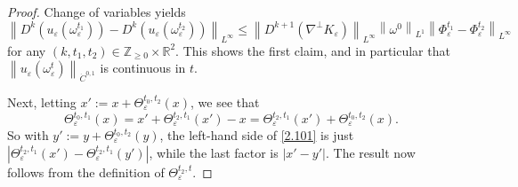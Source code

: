 \documentclass[reqno,centertags,12pt]{amsart}
\theoremstyle{definition}
\numberwithin{equation}{section}
\newcommand{\abs}[1]{\left\lvert#1\right\rvert}
\newcommand{\norm}[1]{\left\|#1\right\|}
\newcommand{\bbR}{{\mathbb{R}}}
\newcommand{\bbZ}{{\mathbb{Z}}}
\newcommand{\eps}{\varepsilon}
\begin{document}
\begin{proof}
    Change of variables  yields
    \[
        \norm{D^{k}(u_{\eps}(\omega_{\eps}^{t_{1}}))
        - D^{k}(u_{\eps}(\omega_{\eps}^{t_{2}}))}_{L^{\infty}}
        \leq \norm{D^{k+1}(\nabla^{\perp}K_{\eps})}_{L^{\infty}}
        \norm{\omega^{0}}_{L^{1}}
        \norm{\Phi_{\eps}^{t_{1}} - \Phi_{\eps}^{t_{2}}}_{L^{\infty}}
    \]
    for any $(k,t_{1},t_{2})\in\bbZ_{\geq 0}\times\bbR^{2}$.  This shows
    the first claim, and in particular that $\norm{u_{\eps}(\omega_{\eps}^{t})}_{\dot{C}^{0,1}}$
    is continuous in $t$. 

    Next, letting $x':=x + \Theta_{\eps}^{t_{0},t_{2}}(x)$, we see that
    \[
        \Theta_{\eps}^{t_{0},t_{1}}(x) = x' + \Theta_{\eps}^{t_{2},t_{1}}(x') - x
        = \Theta_{\eps}^{t_{2},t_{1}}(x') + \Theta_{\eps}^{t_{0},t_{2}}(x).
    \]
    So with $y':=y + \Theta_{\eps}^{t_{0},t_{2}}(y)$, the left-hand side of \eqref{2.101}
    is just $|\Theta_{\eps}^{t_{2},t_{1}}(x')-\Theta_{\eps}^{t_{2},t_{1}}(y')|$,
    while the last factor is $|x'-y'|$. The result now follows from the definition of
    $\Theta_{\eps}^{t_{2},t}$.
%

\end{proof}
\end{document}
